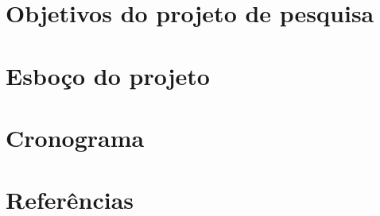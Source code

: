 \section{Objetivos do projeto de pesquisa}
\label{sec:obj}
%
\newpage

\section{Esboço do projeto}
\label{sec:proj}
%
\newpage

\section{Cronograma}
\label{sec:cronos}
%
\newpage

\section{Referências}
\label{sec:ref}
\printbibliography


